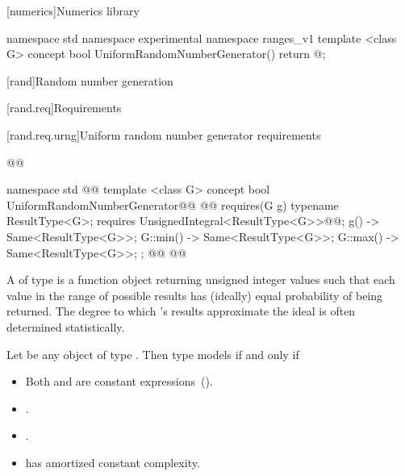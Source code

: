 [numerics]{Numerics library}

{\color{newclr}

\begin{codeblock}
namespace std { namespace experimental { namespace ranges_v1 {
  template <class G>
  concept bool UniformRandomNumberGenerator() { return @\seebelow@; }
}}}
\end{codeblock}
}

\setcounter{section}{4}
[rand]{Random number generation}

[rand.req]{Requirements}


\setcounter{subsubsection}{2}
[rand.req.urng]{Uniform random number generator requirements}%
%

\begin{addedblock}
\begin{codeblock}
@@

namespace std { @@
  template <class G>
  concept bool UniformRandomNumberGenerator@\newtxt{() \{}\oldtxt{ =}@
    @@ requires(G g) {
      typename ResultType<G>;
      requires UnsignedIntegral<ResultType<G>>@\newtxt{()}@;
      { g() } -> Same<ResultType<G>>;
      { G::min() } -> Same<ResultType<G>>;
      { G::max() } -> Same<ResultType<G>>;
    };
  @\newtxt{\}}@
}@\newtxt{\}\}}@
\end{codeblock}
\end{addedblock}

\pnum
A 
 of type 
is a function object
returning unsigned integer values
such that each value
in the range of possible results
has (ideally) equal probability
of being returned.
\enternote
 The degree to which 's results
 approximate the ideal
 is often determined statistically.
\exitnote


\begin{addedblock}
\pnum
Let  be any object of type . Then type  models
 if and only if

\begin{itemize}
\item Both  and  are constant expressions~().
\item {}.
\item {}.
\item {} has amortized constant complexity.
\end{itemize}

\end{addedblock}
